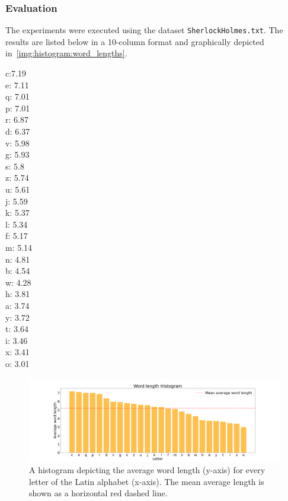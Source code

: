 \documentclass[acmlarge]{acmart}
\begin{document}
  \subsubsection{Evaluation}
  The experiments were executed using the dataset \texttt{SherlockHolmes.txt}. The results are listed below in a 10-column format and graphically depicted in~\autoref{img:histogram:word_lengths}.
  \begin{multicols}{10}
    \noindent
    c:7.19
    \\ e: 7.11
    \\ q: 7.01
    \\ p: 7.01
    \\ r: 6.87
    \\ d: 6.37
    \\ v: 5.98
    \\ g: 5.93
    \\ s: 5.8
    \\ z: 5.74
    \\ u: 5.61
    \\ j: 5.59
    \\ k: 5.37
    \\ l: 5.34
    \\ f: 5.17
    \\ m: 5.14
    \\ n: 4.81
    \\ b: 4.54
    \\ w: 4.28
    \\ h: 3.81
    \\ a: 3.74
    \\ y: 3.72
    \\ t: 3.64
    \\ i: 3.46
    \\ x: 3.41
    \\ o: 3.01
    \label{multicol:test}
  \end{multicols}

  \begin{figure}[tb!]
    \centering
    \includegraphics[width=\linewidth]{figures/download}
    \caption{A histogram depicting the average word length (y-axis) for every letter of the Latin alphabet (x-axis). The mean average length is shown as a horizontal red dashed line.}
    \label{img:histogram:word_lengths}
  \end{figure}
\end{document}
